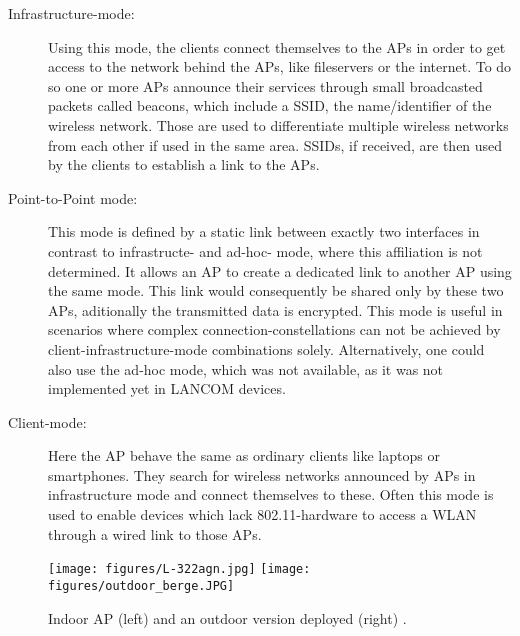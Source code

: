     \begin{description}
      \item[Infrastructure-mode:]
	Using this mode, the clients connect themselves to the APs in order to get access to the network behind the APs, like fileservers or the internet.
	To do so one or more APs announce their services through small broadcasted packets called beacons, which include a \ac{SSID}, 
	the name/identifier of the wireless network. Those are used to differentiate multiple wireless networks from each other if used in the same area. 
	SSIDs, if received, are then used by the clients to establish a link to the APs.

      \item [Point-to-Point mode:]
	This mode is defined by a static link between exactly two interfaces in contrast to infrastructe- and ad-hoc- mode, where this affiliation is not determined.
	It allows an \ac{AP} to create a dedicated link to another \ac{AP} using the same mode. This link would consequently be shared only by these two APs,
	aditionally the transmitted data is encrypted. This mode is useful in scenarios where complex connection-constellations can not be achieved by 
	client-infrastructure-mode combinations solely. Alternatively, one could also use the ad-hoc mode, which was not available, as it was not implemented yet in LANCOM devices.
	
      \item [Client-mode:]
	Here the \ac{AP} behave the same as ordinary clients like laptops or smartphones.
	They search for wireless networks announced by APs in infrastructure mode and connect themselves to these.
	Often this mode is used to enable devices which lack 802.11-hardware to access a \ac{WLAN} through a wired link to those APs.
    \end{description}
    
    \begin{figure}[bh!]
      \centerline{
	\texttt{[image: figures/L-322agn.jpg]}
	\texttt{[image: figures/outdoor\_berge.JPG]}
      }
      \caption{Indoor \ac{AP} (left) and an outdoor version deployed (right) \cite{lancom}.}
      \label{fig:L-322agn}
    \end{figure}
    
    \newpage
     
